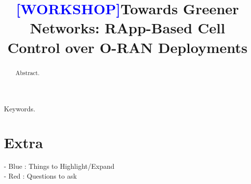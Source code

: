 \documentclass[conference]{IEEEtran}
\begin{document}
\title{\textcolor{blue}{[WORKSHOP]}Towards Greener Networks: RApp-Based Cell Control over O-RAN Deployments}

\author{
}

\maketitle

\begin{abstract}
Abstract.
\end{abstract}

\begin{IEEEkeywords}
Keywords.
\end{IEEEkeywords}

\section{Extra}

- Blue : Things to Highlight/Expand \\
- Red : Questions to ask \\
\end{document}
